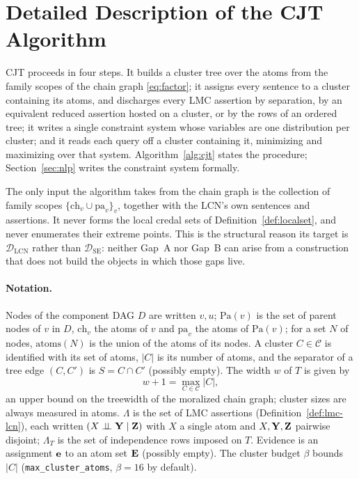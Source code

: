 \documentclass{article} %
\newcommand{\indep}{\perp\!\!\!\perp}
\newcommand{\DSE}{\mathcal{D}_{\mathrm{SE}}}
\newcommand{\DLCN}{\mathcal{D}_{\mathrm{LCN}}}
\newcommand{\ch}{\mathrm{ch}}
\newcommand{\pa}{\mathrm{pa}}
\newcommand{\atoms}{\mathrm{atoms}}
\providecommand{\Pa}{\mathrm{Pa}}
\begin{document}
\section{Detailed Description of the \textsc{CJT} Algorithm}
\label{sec-full-cjt}


\textsc{CJT} proceeds in four steps. It builds a cluster tree over the atoms
from the family scopes of the chain graph \eqref{eq:factor}; it assigns every
sentence to a cluster containing its atoms, and discharges every LMC
assertion by separation, by an equivalent reduced assertion hosted on a cluster,
or by the rows of an ordered tree; it writes a single constraint system whose
variables are one distribution per cluster; and it reads each query off a cluster
containing it, minimizing and maximizing over that system. Algorithm~\ref{alg:cjt} states the
procedure; Section~\ref{sec:nlp} writes the constraint system formally.

The only input the algorithm takes from the chain graph is the collection of
family scopes $\{\ch_v\cup\pa_v\}_v$, together with the LCN's own
sentences and assertions. It never forms the local credal sets of
Definition~\ref{def:localset}, and never enumerates their extreme points. This is the structural
reason its target is $\DLCN$ rather than $\DSE$: neither Gap~A nor Gap~B can
arise from a construction that does not build the objects in which those gaps
live.

\paragraph{Notation.} Nodes of the component DAG $D$ are written $v,u$;
$\Pa(v)$ is the set of parent nodes of $v$ in $D$, $\ch_v$ the atoms of $v$ and
$\pa_v$ the atoms of $\Pa(v)$; for a set $N$ of nodes, $\atoms(N)$ is the union
of the atoms of its nodes. A cluster $C\in\mathcal C$ is identified with its
set of atoms, $|C|$ is its number of atoms, and the separator of a tree edge
$(C,C')$ is $S=C\cap C'$ (possibly empty). The width $w$ of $T$ is given by
\begin{equation}\label{eq:width}
  w+1=\max_{C\in\mathcal C}|C|,
\end{equation}
an upper bound on the treewidth of the moralized chain graph; cluster sizes are
always measured in atoms. $\Lambda$ is the set of LMC assertions
(Definition~\ref{def:lmc-lcn}), each written $(X\indep\bY\mid\bZ)$ with $X$ a
single atom and $X,\mathbf{Y},\mathbf{Z}$ pairwise disjoint; $\Lambda_T$ is the set of
independence rows imposed on $T$. Evidence is an assignment $\mathbf{e}$ to an atom set
$\mathbf{E}$ (possibly empty). The cluster budget $\beta$ bounds $|C|$
(\texttt{max\_cluster\_atoms}, $\beta=16$ by default).
\end{document}
